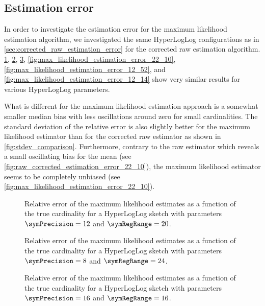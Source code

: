\documentclass[a4paper]{scrartcl}
\begin{document}
\subsection{Estimation error}
\label{sec:maximum_likelihood_estimation_error}
In order to investigate the estimation error for the maximum likelihood estimation algorithm, we investigated the same HyperLogLog configurations as in \cref{sec:corrected_raw_estimation_error} for the corrected raw estimation algorithm. \cref{fig:max_likelihood_estimation_error_12_20}, \cref{fig:max_likelihood_estimation_error_8_24},  \cref{fig:max_likelihood_estimation_error_16_16}, \cref{fig:max_likelihood_estimation_error_22_10}, \cref{fig:max_likelihood_estimation_error_12_52}, and \cref{fig:max_likelihood_estimation_error_12_14} show very similar results for various HyperLogLog parameters. 

What is different for the maximum likelihood estimation approach is a somewhat smaller median bias with less oscillations around zero for small cardinalities. The standard deviation of the relative error is also slightly better for the maximum likelihood estimator than for the corrected raw estimator as shown in \cref{fig:stdev_comparison}. Furthermore, contrary to the raw estimator which reveals a small oscillating bias for the mean (see \cref{fig:raw_corrected_estimation_error_22_10}), the maximum likelihood estimator seems to be completely unbiased (see \cref{fig:max_likelihood_estimation_error_22_10}).

\begin{figure}
\centering

\caption{Relative error of the maximum likelihood estimates as a function of the true cardinality for a HyperLogLog sketch with parameters $\symPrecision = 12$ and $\symRegRange=20$.}
\label{fig:max_likelihood_estimation_error_12_20}
\end{figure}

\begin{figure}
\centering

\caption{Relative error of the maximum likelihood estimates as a function of the true cardinality for a HyperLogLog sketch with parameters $\symPrecision = 8$ and $\symRegRange=24$.}
\label{fig:max_likelihood_estimation_error_8_24}
\end{figure}

\begin{figure}
\centering

\caption{Relative error of the maximum likelihood estimates as a function of the true cardinality for a HyperLogLog sketch with parameters $\symPrecision = 16$ and $\symRegRange=16$.}
\label{fig:max_likelihood_estimation_error_16_16}
\end{figure}
\end{document}
